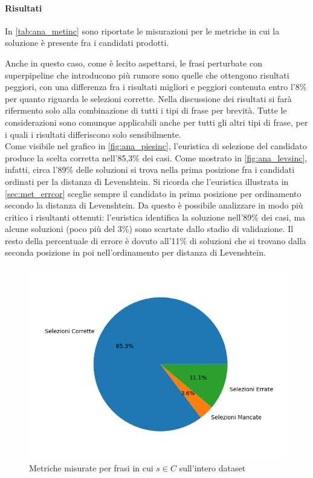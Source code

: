 \paragraph{Risultati}
In \autoref{tab:ana_metinc} sono riportate le misurazioni per le metriche in cui la soluzione è presente fra i candidati prodotti.


Anche in questo caso, come è lecito aspettarsi, le frasi perturbate con superpipeline che introducono più rumore sono quelle che ottengono risultati peggiori, con una differenza fra i risultati migliori e peggiori contenuta entro l'8\% per quanto riguarda le selezioni corrette.
Nella discussione dei risultati si farà rifermento solo alla combinazione di tutti i tipi di frase per brevità. Tutte le considerazioni sono comunque applicabili anche per tutti gli altri tipi di frase, per i quali i risultati differiscono solo sensibilmente.\\
Come visibile nel grafico in \autoref{fig:ana_piesinc}, l'euristica di selezione del candidato produce la scelta corretta nell'85,3\% dei casi. Come mostrato in \autoref{fig:ana_levsinc}, infatti, circa l'89\% delle soluzioni si trova nella prima posizione fra i candidati ordinati per la distanza di Levenshtein. Si ricorda che l'euristica illustrata in \autoref{sec:met_errcor} sceglie sempre il candidato in prima posizione per ordinamento secondo la distanza di Levenshtein. Da questo è possibile analizzare in modo più critico i risultanti ottenuti: l'euristica identifica la soluzione nell'89\% dei casi, ma alcune soluzioni (poco più del 3\%) sono scartate dallo stadio di validazione. Il resto della percentuale di errore è dovuto all'11\% di soluzioni che si trovano dalla seconda posizione in poi nell'ordinamento per distanza di Levenshtein.


\begin{figure}[H]
\centering
\includegraphics[width=\textwidth]{immagini/analisi/correct_combinato}
\caption{Metriche misurate per frasi in cui $s \in C$ sull'intero dataset}
\label{fig:ana_piesinc}
\end{figure}



